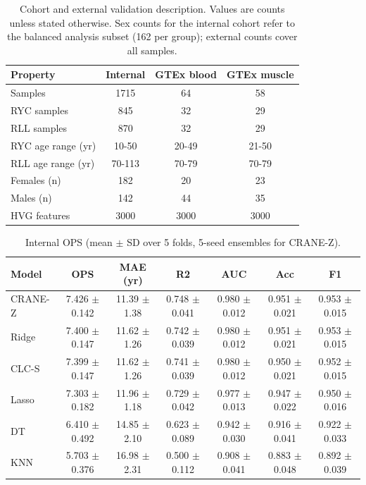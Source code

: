 \documentclass[unnumsec,webpdf,contemporary,large]{oup-authoring-template}
\begin{document}
\begin{table}[htbp]
\caption{Cohort and external validation description. Values are counts unless stated otherwise. Sex counts for the internal cohort refer to the balanced analysis subset (162 per group); external counts cover all samples.}
\label{tab:cohort}
\begin{center}
\begin{tabular}{lccc}
\hline
Property & Internal & GTEx blood & GTEx muscle \\
\hline
Samples & 1715 & 64 & 58 \\
RYC samples & 845 & 32 & 29 \\
RLL samples & 870 & 32 & 29 \\
RYC age range (yr) & 10-50 & 20-49 & 21-50 \\
RLL age range (yr) & 70-113 & 70-79 & 70-79 \\
Females (n) & 182 & 20 & 23 \\
Males (n) & 142 & 44 & 35 \\
HVG features & 3000 & 3000 & 3000 \\
\hline
\end{tabular}
\end{center}
\end{table}

\begin{table}[htbp]
\caption{Internal OPS (mean $\pm$ SD over 5 folds, 5-seed ensembles for CRANE-Z).}
\label{tab:internal}
\begin{center}
\begin{tabular}{lcccccc}
\hline
Model & OPS & MAE (yr) & R2 & AUC & Acc & F1 \\
\hline
CRANE-Z & 7.426 $\pm$ 0.142 & 11.39 $\pm$ 1.38 & 0.748 $\pm$ 0.041 & 0.980 $\pm$ 0.012 & 0.951 $\pm$ 0.021 & 0.953 $\pm$ 0.015 \\
Ridge & 7.400 $\pm$ 0.147 & 11.62 $\pm$ 1.26 & 0.742 $\pm$ 0.039 & 0.980 $\pm$ 0.012 & 0.951 $\pm$ 0.021 & 0.953 $\pm$ 0.015 \\
CLC-S & 7.399 $\pm$ 0.147 & 11.62 $\pm$ 1.26 & 0.741 $\pm$ 0.039 & 0.980 $\pm$ 0.012 & 0.950 $\pm$ 0.021 & 0.952 $\pm$ 0.015 \\
Lasso & 7.303 $\pm$ 0.182 & 11.96 $\pm$ 1.18 & 0.729 $\pm$ 0.042 & 0.977 $\pm$ 0.013 & 0.947 $\pm$ 0.022 & 0.950 $\pm$ 0.016 \\
DT & 6.410 $\pm$ 0.492 & 14.85 $\pm$ 2.10 & 0.623 $\pm$ 0.089 & 0.942 $\pm$ 0.030 & 0.916 $\pm$ 0.041 & 0.922 $\pm$ 0.033 \\
KNN & 5.703 $\pm$ 0.376 & 16.98 $\pm$ 2.31 & 0.500 $\pm$ 0.112 & 0.908 $\pm$ 0.041 & 0.883 $\pm$ 0.048 & 0.892 $\pm$ 0.039 \\
\hline
\end{tabular}
\end{center}
\end{table}
\end{document}
